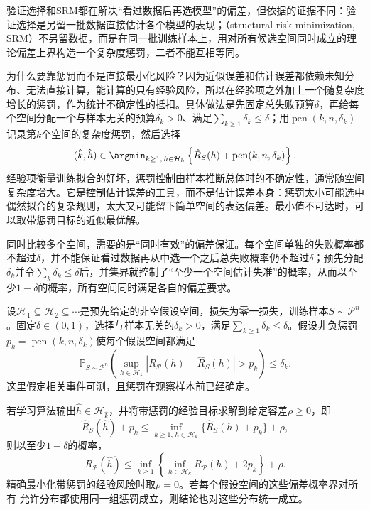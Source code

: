 验证选择和SRM都在解决“看过数据后再选模型”的偏差，但依据的证据不同：验证选择是另留一批数据直接估计各个模型的表现；（structural risk minimization, SRM）不另留数据，而是在同一批训练样本上，用对所有候选空间同时成立的理论偏差上界构造一个复杂度惩罚，二者不能互相等同。

为什么要靠惩罚而不是直接最小化风险？因为近似误差和估计误差都依赖未知分布、无法直接计算，能计算的只有经验风险，所以在经验项之外加上一个随复杂度增长的惩罚，作为统计不确定性的抵扣。具体做法是先固定总失败预算$\delta$，再给每个空间分配一个与样本无关的预算$\delta_k>0$、满足$\sum_{k\geq1}\delta_k\leq\delta$；用$\operatorname{pen}(k,n,\delta_k)$记录第$k$个空间的复杂度惩罚，然后选择
\begin{equation}
  (\hat k,\hat h)
  \in\argmin_{k\geq1,\,h\in\mathcal H_k}
  \left\{\hat R_S(h)+\operatorname{pen}(k,n,\delta_k)\right\}.
  \label{eq:structural-risk-minimization}
\end{equation}
经验项衡量训练拟合的好坏，惩罚控制由样本推断总体时的不确定性，通常随空间复杂度增大。它是控制估计误差的工具，而不是估计误差本身：惩罚太小可能选中偶然拟合的复杂规则，太大又可能留下简单空间的表达偏差。最小值不可达时，可以取带惩罚目标的近似最优解。

同时比较多个空间，需要的是“同时有效”的偏差保证。每个空间单独的失败概率都不超过$\delta$，并不能保证看过数据再从中选一个之后总失败概率仍不超过$\delta$；预先分配$\delta_k$并令$\sum_k\delta_k\leq\delta$后，并集界就控制了“至少一个空间估计失准”的概率，从而以至少$1-\delta$的概率，所有空间同时满足各自的偏差要求。

\begin{theorem}[结构风险最小化的期望风险保证]
\label{thm:srm-oracle-bound}
设$\mathcal H_1\subseteq\mathcal H_2\subseteq\cdots$是预先给定的非空假设空间，损失为零一损失，训练样本$S\sim\mathcal P^n$。固定$\delta\in(0,1)$，选择与样本无关的$\delta_k>0$，满足$\sum_{k\geq1}\delta_k\leq\delta$。假设非负惩罚$p_k=\operatorname{pen}(k,n,\delta_k)$使每个假设空间都满足
\begin{equation}
 \mathbb P_{S\sim\mathcal P^n}\left(
 \sup_{h\in\mathcal H_k}
 |R_{\mathcal P}(h)-\hat R_S(h)|>p_k
 \right)\leq\delta_k.
 \label{eq:srm-classwise-confidence}
\end{equation}
这里假定相关事件可测，且惩罚在观察样本前已经确定。

若学习算法输出$\hat h\in\mathcal H_{\hat k}$，并将带惩罚的经验目标求解到给定容差$\rho\geq0$，即
\begin{equation}
 \hat R_S(\hat h)+p_{\hat k}
 \leq\inf_{k\geq1,\,h\in\mathcal H_k}
       \{\hat R_S(h)+p_k\}+\rho,
 \label{eq:srm-approximate-minimizer}
\end{equation}
则以至少$1-\delta$的概率，
\begin{equation}
 R_{\mathcal P}(\hat h)
 \leq\inf_{k\geq1}\left\{
       \inf_{h\in\mathcal H_k}R_{\mathcal P}(h)+2p_k
       \right\}+\rho.
 \label{eq:srm-oracle}
\end{equation}
精确最小化带惩罚的经验风险时取$\rho=0$。若每个假设空间的这些偏差概率界对所有
允许分布都使用同一组惩罚成立，则结论也对这些分布统一成立。
\end{theorem}

